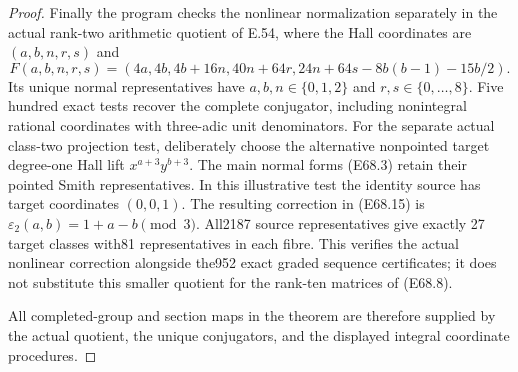\begin{proof}
Finally the program checks the nonlinear
normalization separately in the actual
rank-two arithmetic quotient of E.54, where
the Hall coordinates are $(a,b,n,r,s)$ and
\[
 F(a,b,n,r,s)=
  (4a,4b,4b+16n,40n+64r,
       24n+64s-8b(b-1)-15b/2).
 \tag{E68.20}
\]
Its unique normal representatives have
$a,b,n\in\{0,1,2\}$ and $r,s\in\{0,\ldots,8\}$.
Five hundred exact tests recover the complete
conjugator, including nonintegral rational
coordinates with three-adic unit denominators.
For the separate actual class-two projection test,
deliberately choose the alternative nonpointed
target degree-one Hall lift $x^{a+3}y^{b+3}$.
The main normal forms (E68.3) retain their pointed
Smith representatives. In this illustrative test
the identity source has target coordinates
$(0,0,1)$.
The resulting correction in (E68.15) is
$\varepsilon_2(a,b)=1+a-b\pmod3$.
All2187 source representatives give exactly
27 target classes with81 representatives
in each fibre. This verifies the actual
nonlinear correction alongside the952
exact graded sequence certificates; it
does not substitute this smaller quotient
for the rank-ten matrices of (E68.8).

All completed-group and section maps in
the theorem are therefore supplied by the
actual quotient, the unique conjugators,
and the displayed integral coordinate
procedures.
\end{proof}
